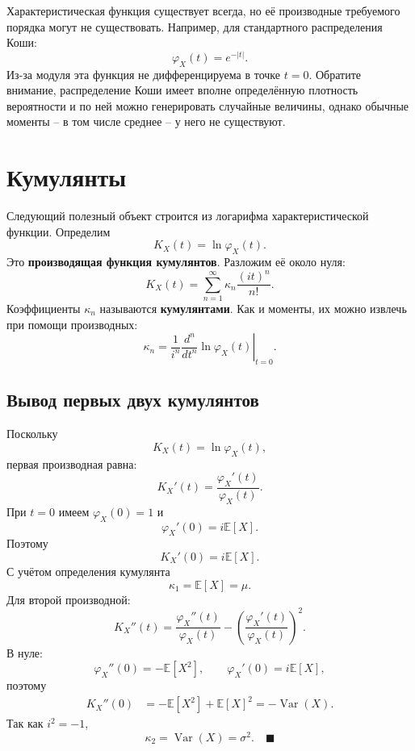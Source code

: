 \documentclass[
  russian,
  12pt,
  a4paper,
  a4paper,
  openany]{scrbook}
\begin{document}
Характеристическая функция существует всегда, но её производные
требуемого порядка могут не существовать. Например, для стандартного
распределения Коши: \[\varphi_X(t)=e^{-|t|}.\] Из-за модуля эта функция
не дифференцируема в точке \(t=0\). Обратите внимание, распределение
Коши имеет вполне определённую плотность вероятности и по ней можно
генерировать случайные величины, однако обычные моменты -- в том числе
среднее -- у него не существуют.

\section{Кумулянты}\label{ux43aux443ux43cux443ux43bux44fux43dux442ux44b}

\begin{booknote}

Следующий полезный объект строится из логарифма характеристической
функции. Определим \[\boxed{
K_X(t)=\ln\varphi_X(t).
}\] Это \textbf{производящая функция кумулянтов}. Разложим её около
нуля: \[\boxed{
K_X(t)
=
\sum_{n=1}^{\infty}
\kappa_n\frac{(it)^n}{n!}.
}\] Коэффициенты \(\kappa_n\) называются \textbf{кумулянтами}. Как и
моменты, их можно извлечь при помощи производных: \[\boxed{
\kappa_n
=
\frac{1}{i^n}
\left.
\frac{d^n}{dt^n}
\ln\varphi_X(t)
\right|_{t=0}.
}\]

\end{booknote}

\begin{bookderivation}

\subsection{Вывод первых двух
кумулянтов}\label{ux432ux44bux432ux43eux434-ux43fux435ux440ux432ux44bux445-ux434ux432ux443ux445-ux43aux443ux43cux443ux43bux44fux43dux442ux43eux432}

Поскольку \[K_X(t)=\ln\varphi_X(t),\] первая производная равна:
\[K_X'(t)
=
\frac{\varphi_X'(t)}{\varphi_X(t)}.\] При \(t=0\) имеем
\(\varphi_X(0)=1\) и \[\varphi_X'(0)=i\mathbb{E}[X].\] Поэтому \[K_X'(0)
=
i\mathbb{E}[X].\] С учётом определения кумулянта \[\boxed{
\kappa_1
=
\mathbb{E}[X]
=
\mu.
}\] Для второй производной: \[K_X''(t)
=
\frac{\varphi_X''(t)}{\varphi_X(t)}
-
\left(
\frac{\varphi_X'(t)}{\varphi_X(t)}
\right)^2.\] В нуле: \[\varphi_X''(0)=-\mathbb{E}[X^2],
\qquad
\varphi_X'(0)=i\mathbb{E}[X],\] поэтому \[\begin{aligned}
K_X''(0)
&=
-\mathbb{E}[X^2]
+\mathbb{E}[X]^2=
-\operatorname{Var}(X).
\end{aligned}\] Так как \(i^2=-1\), \[\boxed{
\kappa_2
=
\operatorname{Var}(X)
=
\sigma^2.
} \quad \blacksquare\]

\end{bookderivation}
\end{document}
